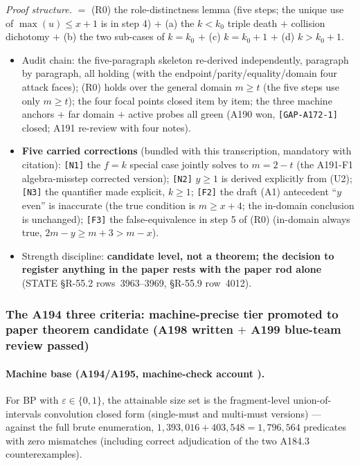 \noindent\emph{Proof structure.} $=$ (R0) the role-distinctness lemma (five
steps; the unique use of $\max(u)\le x+1$ is in step 4) $+$ (a) the
$k<k_0$ triple death $+$ collision dichotomy $+$ (b) the two sub-cases of
$k=k_0$ $+$ (c) $k=k_0+1$ $+$ (d) $k>k_0+1$.

\begin{itemize}
\item Audit chain: the five-paragraph skeleton re-derived independently,
paragraph by paragraph, all holding (with the endpoint/parity/equality/domain
four attack faces); (R0) holds over the general domain $m\ge t$ (the five
steps use only $m\ge t$); the four focal points closed item by item; the
three machine anchors $+$ far domain $+$ active probes all green (A190 won,
\texttt{[GAP-A172-1]} closed; A191 re-review with four notes).
\item \textbf{Five carried corrections} (bundled with this transcription,
mandatory with citation): \texttt{[N1]} the $f=k$ special case jointly solves
to $m=2-t$ (the A191-F1 algebra-misstep corrected version); \texttt{[N2]}
$y\ge1$ is derived explicitly from (U2); \texttt{[N3]} the quantifier made
explicit, $k\ge1$; \texttt{[F2]} the draft (A1) antecedent ``$y$ even'' is
inaccurate (the true condition is $m\ge x+4$; the in-domain conclusion is
unchanged); \texttt{[F3]} the false-equivalence in step 5 of (R0) (in-domain
always true, $2m-y\ge m+3>m-x$).
\item Strength discipline: \textbf{candidate level, not a theorem; the
decision to register anything in the paper rests with the paper rod alone}
(STATE \S R-55.2 rows~3963--3969, \S R-55.9 row~4012).
\end{itemize}

\subsubsection{The A194 three criteria: machine-precise tier promoted to
paper theorem candidate (A198 written $+$ A199 blue-team review passed)
\tierPCand}\label{subsec:add-a194}

\paragraph{Machine base (A194/A195, machine-check account \tierMCA).}

\begin{lemma}\label{lem:a1941}
For BP with $\varepsilon\in\{0,1\}$, the attainable size set is the
fragment-level union-of-intervals convolution closed form (single-must and
multi-must versions) --- against the full brute enumeration,
$1{,}393{,}016+403{,}548=1{,}796{,}564$ predicates with zero mismatches
(including correct adjudication of the two A184.3 counterexamples).
\end{lemma}

